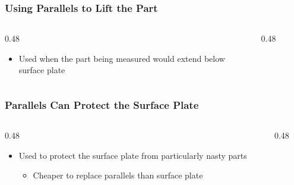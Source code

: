 \begin{frame}
	\frametitle{Using Parallels to Lift the Part}
    \begin{columns}
        \begin{column}{0.48\linewidth}
            \begin{itemize}[<+- | alert@+>]
                \item Used when the part being measured would extend below surface plate
            \end{itemize}
        \end{column}
        \begin{column}{0.48\linewidth}
            \begin{figure}
                \centering
                \resizebox{\linewidth}{!}{
                    
                }
            \end{figure}
        \end{column}
    \end{columns}
\end{frame}

\begin{frame}
	\frametitle{Parallels Can Protect the Surface Plate}

    \begin{columns}
        \begin{column}{0.48\linewidth}
            \begin{itemize}[<+- | alert@+>]
                \item Used to protect the surface plate from particularly nasty parts
                    \begin{itemize}
                        \item Cheaper to replace parallels than surface plate
                    \end{itemize}
            \end{itemize}
        \end{column}
        \begin{column}{0.48\linewidth}
        \end{column}
    \end{columns}
\end{frame}

